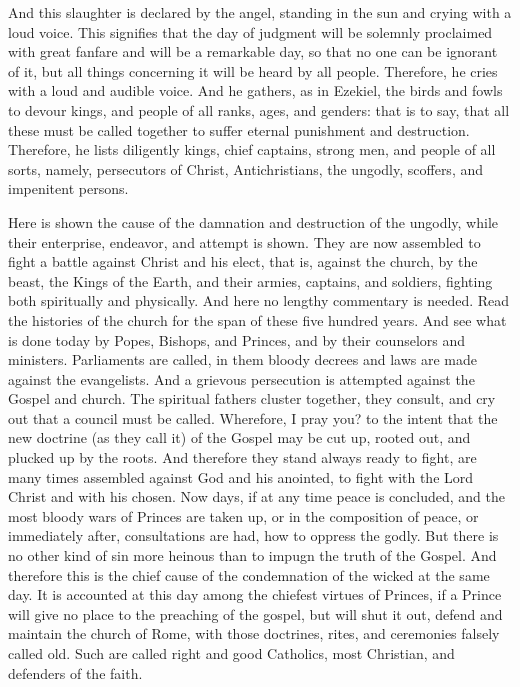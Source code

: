 And this slaughter is declared by the angel, standing in the sun and crying with a loud voice. This signifies that the day of judgment will be solemnly proclaimed with great fanfare and will be a remarkable day, so that no one can be ignorant of it, but all things concerning it will be heard by all people. Therefore, he cries with a loud and audible voice. And he gathers, as in Ezekiel, the birds and fowls to devour kings, and people of all ranks, ages, and genders: that is to say, that all these must be called together to suffer eternal punishment and destruction. Therefore, he lists diligently kings, chief captains, strong men, and people of all sorts, namely, persecutors of Christ, Antichristians, the ungodly, scoffers, and impenitent persons.

Here is shown the cause of the damnation and destruction of the ungodly, while their enterprise, endeavor, and attempt is shown. They are now assembled to fight a battle against Christ and his elect, that is, against the church, by the beast, the Kings of the Earth, and their armies, captains, and soldiers, fighting both spiritually and physically. And here no lengthy commentary is needed. Read the histories of the church for the span of these five hundred years. And see what is done today by Popes, Bishops, and Princes, and by their counselors and ministers. Parliaments are called, in them bloody decrees and laws are made against the evangelists. And a grievous persecution is attempted against the Gospel and church. The spiritual fathers cluster together, they consult, and cry out that a council must be called. Wherefore, I pray you? to the intent that the new doctrine (as they call it) of the Gospel may be cut up, rooted out, and plucked up by the roots. And therefore they stand always ready to fight, are many times assembled against God and his anointed, to fight with the Lord Christ and with his chosen. Now days, if at any time peace is concluded, and the most bloody wars of Princes are taken up, or in the composition of peace, or immediately after, consultations are had, how to oppress the godly. But there is no other kind of sin more heinous than to impugn the truth of the Gospel. And therefore this is the chief cause of the condemnation of the wicked at the same day. It is accounted at this day among the chiefest virtues of Princes, if a Prince will give no place to the preaching of the gospel, but will shut it out, defend and maintain the church of Rome, with those doctrines, rites, and ceremonies falsely called old. Such are called right and good Catholics, most Christian, and defenders of the faith.

